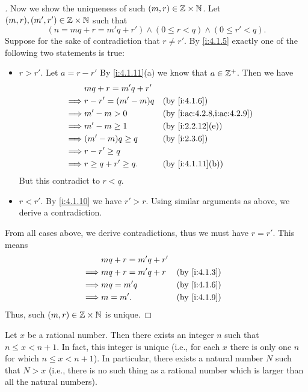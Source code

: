 \begin{proof}[]
  Now we show the uniqueness of such \((m, r) \in \mathbb{Z} \times \mathbb{N}\).
  Let \((m, r), (m', r') \in \mathbb{Z} \times \mathbb{N}\) such that
  \[
    (n = mq + r = m'q + r') \land (0 \leq r < q) \land (0 \leq r' < q).
  \]
  Suppose for the sake of contradiction that \(r \neq r'\).
  By \cref{i:4.1.5} exactly one of the following two statements is true:
  \begin{itemize}
    \item \(r > r'\).
          Let \(a = r - r'\)
          By \cref{i:4.1.11}(a) we know that \(a \in \mathbb{Z}^+\).
          Then we have
          \begin{align*}
                     & mq + r = m'q + r'                                     \\
            \implies & r - r' = (m' - m)q    &  & \by{i:4.1.6}               \\
            \implies & m' - m > 0            &  & \by{i:ac:4.2.8,i:ac:4.2.9} \\
            \implies & m' - m \geq 1         &  & \by{i:2.2.12}[e]           \\
            \implies & (m' - m)q \geq q      &  & \by{i:2.3.6}               \\
            \implies & r - r' \geq q                                         \\
            \implies & r \geq q + r' \geq q. &  & \by{i:4.1.11}[b]
          \end{align*}
          But this contradict to \(r < q\).
    \item \(r < r'\).
          By \cref{i:4.1.10} we have \(r' > r\).
          Using similar arguments as above, we derive a contradiction.
  \end{itemize}
  From all cases above, we derive contradictions, thus we must have \(r = r'\).
  This means
  \begin{align*}
             & mq + r = m'q + r'                   \\
    \implies & mq + r = m'q + r  &  & \by{i:4.1.3} \\
    \implies & mq = m'q          &  & \by{i:4.1.6} \\
    \implies & m = m'.           &  & \by{i:4.1.9}
  \end{align*}
  Thus, such \((m, r) \in \mathbb{Z} \times \mathbb{N}\) is unique.
\end{proof}

\begin{prop}\label{i:4.4.1}
  Let \(x\) be a rational number.
  Then there exists an integer \(n\) such that \(n \leq x < n + 1\).
  In fact, this integer is unique (i.e., for each \(x\) there is only one \(n\) for which \(n \leq x < n + 1\)).
  In particular, there exists a natural number \(N\) such that \(N > x\)
  (i.e., there is no such thing as a rational number which is larger than all the natural numbers).
\end{prop}

